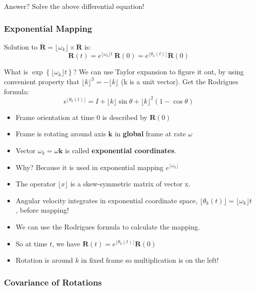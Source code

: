 Answer? Solve the above differential equation!
\newpage
\subsubsection{Exponential Mapping}
Solution to $ \dot{\mathbf{R}} = \lfloor \omega_k \rfloor \times \mathbf{R}$ is:
\begin{equation}
  {\mathbf{R}}(t) = e^{\lfloor \omega_k \rfloor t} \ \mathbf{R}(0) = e^{\lfloor \theta_k(t) \rfloor }\mathbf{R}(0)
  \label{eq:exponential mapping}
\end{equation}

What is $\exp\left\{{\lfloor \omega_k \rfloor t}\right\}$? We can use Taylor expansion to figure it out, by using convenient property that $\lfloor k \rfloor ^3 = - \lfloor k \rfloor$ (k is a unit vector).
Get the Rodrigues formula:
\begin{equation}
  e^{\lfloor \theta_k(t) \rfloor } = I + \lfloor k \rfloor \sin \theta + \lfloor k \rfloor ^2 (1-\cos \theta)
  \label{eq:Rodrigues formula}
\end{equation}

\begin{itemize}
  \item Frame orientation at time 0 is described by $\mathbf{R}(0)$
  \item Frame is rotating around axis $\mathbf{k}$ in \textbf{global} frame at rate $\omega$
  \item Vector $\omega_k = \omega \mathbf{k}$ is called \textbf{exponential coordinates}.
  \item Why? Because it is used in exponential mapping $e^{\lfloor \omega_k \rfloor }$
  \item The operator $\lfloor x \rfloor$ is a skew-symmetric matrix of vector x.
  \item Angular velocity integrates in exponential coordinate space, $\lfloor \theta_k(t) \rfloor = \lfloor \omega_k \rfloor t$, before mapping!
  \item We can use the Rodrigues formula to calculate the mapping.
  \item So at time $t$, we have $\mathbf{R}(t) = e^{\lfloor \theta_k(t) \rfloor} \mathbf{R}(0)$
  \item Rotation is around $k$ in fixed frame so multiplication is on the left!
\end{itemize}

\subsubsection{Covariance of Rotations}

